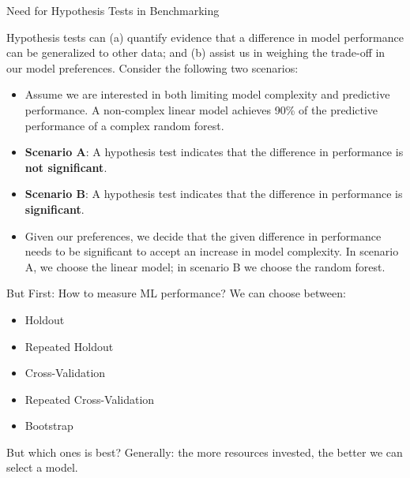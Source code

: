\documentclass[11pt,compress,t,notes=noshow, aspectratio=169, xcolor=table]{beamer}
\begin{document}
\begin{frame}{Need for Hypothesis Tests in Benchmarking}

Hypothesis tests can (a) quantify evidence that a difference in model performance can be generalized to other data; and (b) assist us in weighing the trade-off in our model preferences. Consider the following two scenarios:
\vspace{0.25cm}
\begin{itemize}
    \setlength\itemsep{1em}
    \item Assume we are interested in both limiting model complexity and predictive performance. A non-complex linear model achieves 90\% of the predictive performance of a complex random forest.
    \item \textbf{Scenario A}: A hypothesis test indicates that the difference in performance is \textbf{not significant}.
    \item \textbf{Scenario B}: A hypothesis test indicates that the difference in performance is \textbf{significant}.
    \item Given our preferences, we decide that the given difference in performance needs to be significant to accept an increase in model complexity. In scenario A, we choose the linear model; in scenario B we choose the random forest.
\end{itemize}

\end{frame}

\begin{frame}{But First: How to measure ML performance?}
\vfill
We can choose between:
\vfill
\begin{itemize}
    \item Holdout
    \item Repeated Holdout
    \item Cross-Validation
    \item Repeated Cross-Validation
    \item Bootstrap
\end{itemize}
\vfill
But which ones is best?
\pause
\newline{}
Generally: the more resources invested, the better we can select a model.
\end{frame}
\end{document}
